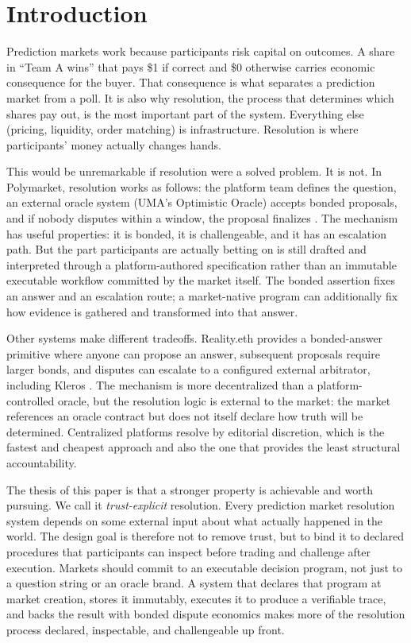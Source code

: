 \documentclass[10pt]{article}
\begin{document}
\vspace{1em}
{
\small
\renewcommand{\contentsname}{}
\setcounter{tocdepth}{2}
\tableofcontents
}
\vspace{0.5em}

\section{Introduction}

Prediction markets work because participants risk capital on outcomes. A share in ``Team A wins'' that pays \$1 if correct and \$0 otherwise carries economic consequence for the buyer. That consequence is what separates a prediction market from a poll. It is also why resolution, the process that determines which shares pay out, is the most important part of the system. Everything else (pricing, liquidity, order matching) is infrastructure. Resolution is where participants' money actually changes hands.

This would be unremarkable if resolution were a solved problem. It is not. In Polymarket, resolution works as follows: the platform team defines the question, an external oracle system (UMA's Optimistic Oracle) accepts bonded proposals, and if nobody disputes within a window, the proposal finalizes \cite{uma2021}. The mechanism has useful properties: it is bonded, it is challengeable, and it has an escalation path. But the part participants are actually betting on is still drafted and interpreted through a platform-authored specification rather than an immutable executable workflow committed by the market itself. The bonded assertion fixes an answer and an escalation route; a market-native program can additionally fix how evidence is gathered and transformed into that answer.

Other systems make different tradeoffs. Reality.eth provides a bonded-answer primitive where anyone can propose an answer, subsequent proposals require larger bonds, and disputes can escalate to a configured external arbitrator, including Kleros \cite{realityeth}. The mechanism is more decentralized than a platform-controlled oracle, but the resolution logic is external to the market: the market references an oracle contract but does not itself declare how truth will be determined. Centralized platforms resolve by editorial discretion, which is the fastest and cheapest approach and also the one that provides the least structural accountability.

The thesis of this paper is that a stronger property is achievable and worth pursuing. We call it \emph{trust-explicit} resolution. Every prediction market resolution system depends on some external input about what actually happened in the world. The design goal is therefore not to remove trust, but to bind it to declared procedures that participants can inspect before trading and challenge after execution. Markets should commit to an executable decision program, not just to a question string or an oracle brand. A system that declares that program at market creation, stores it immutably, executes it to produce a verifiable trace, and backs the result with bonded dispute economics makes more of the resolution process declared, inspectable, and challengeable up front.
\end{document}
